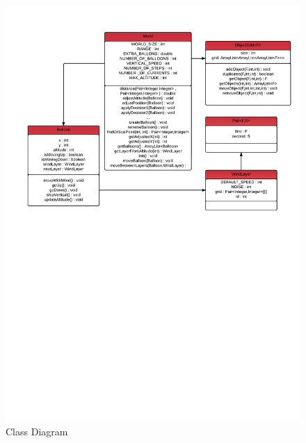 \begin{figure}[H]
    \centering
    \includegraphics[width=\textwidth, trim= 1cm 14cm 0cm 0cm, clip]{graphics/classDiagram.pdf}
    \caption{Class Diagram}
    \label{fig:class_diagram}
\end{figure}


